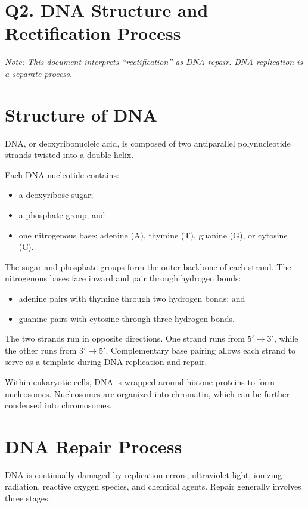 \documentclass[12pt]{article}
\begin{document}
\section*{Q2. DNA Structure and Rectification Process}


\textit{Note: This document interprets ``rectification'' as DNA repair. DNA
replication is a separate process.}

\section{Structure of DNA}

DNA, or deoxyribonucleic acid, is composed of two antiparallel polynucleotide
strands twisted into a double helix.

Each DNA nucleotide contains:

\begin{itemize}
    \item a deoxyribose sugar;
    \item a phosphate group; and
    \item one nitrogenous base: adenine (A), thymine (T), guanine (G), or
    cytosine (C).
\end{itemize}

The sugar and phosphate groups form the outer backbone of each strand. The
nitrogenous bases face inward and pair through hydrogen bonds:

\begin{itemize}
    \item adenine pairs with thymine through two hydrogen bonds; and
    \item guanine pairs with cytosine through three hydrogen bonds.
\end{itemize}

The two strands run in opposite directions. One strand runs from
\(5' \rightarrow 3'\), while the other runs from \(3' \rightarrow 5'\).
Complementary base pairing allows each strand to serve as a template during
DNA replication and repair.

Within eukaryotic cells, DNA is wrapped around histone proteins to form
nucleosomes. Nucleosomes are organized into chromatin, which can be further
condensed into chromosomes.

\section{DNA Repair Process}

DNA is continually damaged by replication errors, ultraviolet light, ionizing
radiation, reactive oxygen species, and chemical agents. Repair generally
involves three stages:
\end{document}
